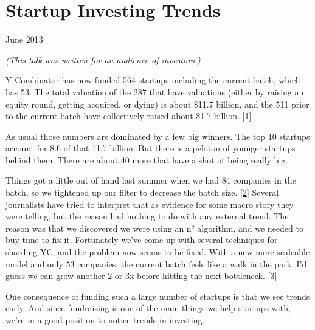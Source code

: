 \chapter{Startup Investing Trends}


            
              
                

June 2013

\emph{(This talk was written for an audience of investors.)}

Y Combinator has now funded 564 startups
                  including the current batch, which has 53. The total valuation
                  of the 287 that have valuations (either by raising an equity
                  round, getting acquired, or dying) is about \$11.7 billion, and
                  the 511 prior to the current batch have collectively raised
                  about \$1.7 billion.
                  [\href{\#f1n}{1}]

As usual those numbers are dominated by a few big
                  winners. The top 10 startups account for 8.6 of that 11.7
                  billion. But there is a peloton of younger startups behind
                  them. There are about 40 more that have a shot at being really
                  big.

Things got a little out of hand last summer
                  when we had 84 companies in the batch, so we tightened up our
                  filter to decrease the batch size.
                  [\href{\#f2n}{2}]
                  Several journalists have tried to interpret that as evidence
                  for some macro story they were telling, but the reason had
                  nothing to do with any external trend. The reason was that we
                  discovered we were using an n² algorithm, and we needed
                  to buy time to fix it. Fortunately we've come up with several
                  techniques for sharding YC, and the problem now seems to be
                  fixed. With a new more scaleable model and only 53 companies,
                  the current batch feels like a walk in the park. I'd guess we
                  can grow another 2 or 3x before hitting the next bottleneck.
                  [\href{\#f3n}{3}]

One consequence of funding such a large number of
                  startups is that we see trends early. And since fundraising is
                  one of the main things we help startups with, we're in a good
                  position to notice trends in investing.

